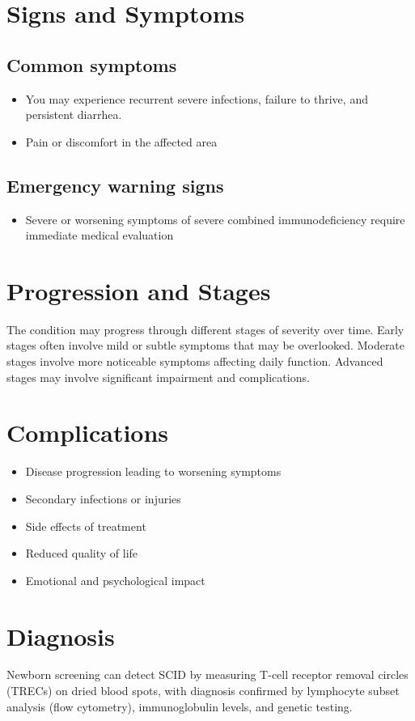 \section{Signs and Symptoms}

\subsection{Common symptoms}
\begin{itemize}[noitemsep]
  \item You may experience recurrent severe infections, failure to thrive, and persistent diarrhea.

  \item Pain or discomfort in the affected area
  \end{itemize}

\subsection{Emergency warning signs}
\begin{itemize}[noitemsep]
  \item Severe or worsening symptoms of severe combined immunodeficiency require immediate medical evaluation
\end{itemize}
\section{Progression and Stages}
The condition may progress through different stages of severity over time. Early stages often involve mild or subtle symptoms that may be overlooked. Moderate stages involve more noticeable symptoms affecting daily function. Advanced stages may involve significant impairment and complications.
\section{Complications}
\begin{itemize}[noitemsep]
  \item Disease progression leading to worsening symptoms
  \item Secondary infections or injuries
  \item Side effects of treatment
  \item Reduced quality of life
  \item Emotional and psychological impact
\end{itemize}
\section{Diagnosis}
Newborn screening can detect SCID by measuring T-cell receptor removal circles (TRECs) on dried blood spots, with diagnosis confirmed by lymphocyte subset analysis (flow cytometry), immunoglobulin levels, and genetic testing.


